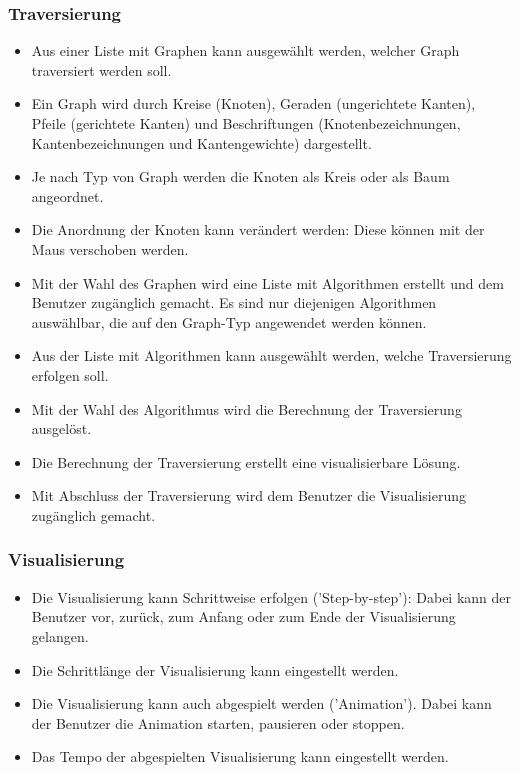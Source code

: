 \subsubsection{Traversierung}
\label{subsubsec:Traversierung}
\begin{itemize}
  \item Aus einer Liste mit Graphen kann ausgew\"ahlt werden, welcher Graph traversiert werden soll.
  \item Ein Graph wird durch Kreise (Knoten), Geraden (ungerichtete Kanten), Pfeile (gerichtete Kanten) und Beschriftungen (Knotenbezeichnungen, Kantenbezeichnungen und Kantengewichte) dargestellt.
  \item Je nach Typ von Graph werden die Knoten als Kreis oder als Baum angeordnet.
  \item Die Anordnung der Knoten kann ver\"andert werden: Diese k\"onnen mit der Maus verschoben werden.
  \item Mit der Wahl des Graphen wird eine Liste mit Algorithmen erstellt und dem Benutzer zug\"anglich gemacht. Es sind nur diejenigen Algorithmen ausw\"ahlbar, die auf den Graph-Typ angewendet werden k\"onnen.
  \item Aus der Liste mit Algorithmen kann ausgew\"ahlt werden, welche Traversierung erfolgen soll.
  \item Mit der Wahl des Algorithmus wird die Berechnung der Traversierung ausgel\"ost.
  \item Die Berechnung der Traversierung erstellt eine visualisierbare L\"osung.
  \item Mit Abschluss der Traversierung wird dem Benutzer die Visualisierung zug\"anglich gemacht.
\end{itemize}
% 
\subsubsection{Visualisierung}
\label{subsubsec:Visualisierung}
\begin{itemize}
  \item Die Visualisierung kann Schrittweise erfolgen ('Step-by-step'): Dabei kann der Benutzer vor, zur\"uck, zum Anfang oder zum Ende der Visualisierung gelangen.
  \item Die Schrittl\"ange der Visualisierung kann eingestellt werden.
  \item Die Visualisierung kann auch abgespielt werden ('Animation'). Dabei kann der Benutzer die Animation starten, pausieren oder stoppen.
  \item Das Tempo der abgespielten Visualisierung kann eingestellt werden.
\end{itemize}
% 
